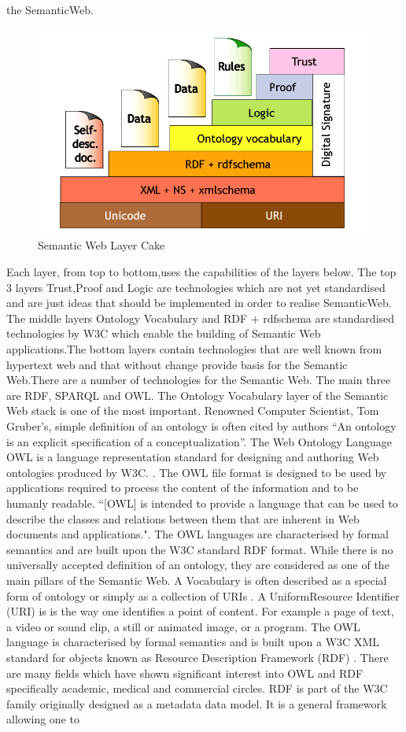 the SemanticWeb. \begin{figure}\includegraphics[width=1\linewidth]{images/semanticwebcake}\caption{Semantic Web Layer Cake \cite{cake}}\label{fig:sw}\end{figure} Each layer, from top to bottom,uses the capabilities of the layers below. The top 3 layers Trust,Proof and Logic are technologies which are not yet standardised and are just ideas that should be implemented in order to realise SemanticWeb. The middle layers Ontology Vocabulary and RDF + rdfschema are standardised technologies by W3C which enable the building of Semantic Web applications.The bottom layers contain technologies that are well known from hypertext web and that without change provide basis for the Semantic Web.There are a number of technologies for the Semantic Web. The main three are RDF, SPARQL and OWL. The Ontology Vocabulary layer of the Semantic Web stack is one of the most important. Renowned Computer Scientist, Tom Gruber's, simple definition of an ontology is often cited by authors ``An ontology is an explicit specification of a conceptualization''. The Web Ontology Language OWL is a language representation standard for designing and authoring Web ontologies produced by W3C. \cite{owl}. The OWL file format is designed to be used by applications required to process the content of the information and to be humanly readable. ``[OWL] is intended to provide a language that can be used to describe the classes and relations between them that are inherent in Web documents and applications."\cite{owl}. The OWL languages are characterised by formal semantics and are built upon the W3C standard RDF format. While there is no universally accepted definition of an ontology, they are considered as one of the main pillars of the Semantic Web. A Vocabulary is often described as a special form of ontology or simply as a collection of URIs \cite{11}. A UniformResource Identifier (URI) is is the way one identifies a point of content. For example a page of text, a video or sound clip, a still or animated image, or a program. The OWL language is characterised by formal semantics and is built upon a W3C XML standard for objects known as Resource Description Framework (RDF) \cite{15}. There are many fields which have shown significant interest into OWL and RDF specifically academic, medical and commercial circles. RDF is part of the W3C family originally designed as a metadata data model. It is a general framework allowing one to 